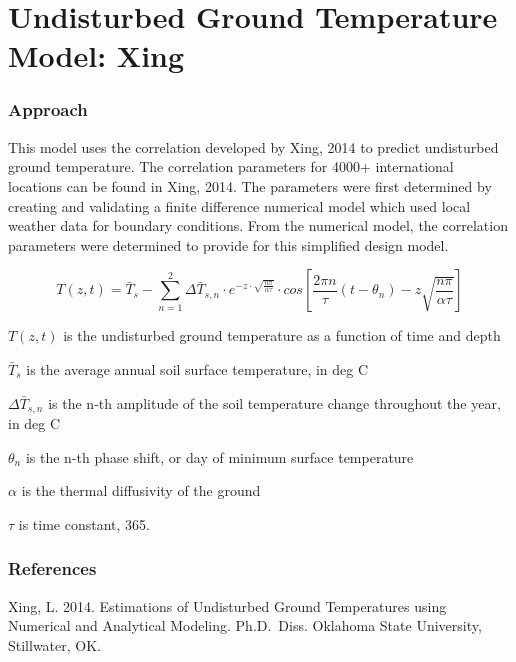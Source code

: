 \section{Undisturbed Ground Temperature Model: Xing}\label{undisturbed-ground-temperature-model-xing}

\subsubsection{Approach}\label{approach-005}

This model uses the correlation developed by Xing, 2014 to predict undisturbed ground temperature. The correlation parameters for 4000+ international locations can be found in Xing, 2014. The parameters were first determined by creating and validating a finite difference numerical model which used local weather data for boundary conditions. From the numerical model, the correlation parameters were determined to provide for this simplified design model.

\begin{equation}
T(z,t) = \bar{T}_{s} - \sum_{n = 1}^{2} \Delta\bar{T}_{s,n} \cdot e^{-z \cdot \sqrt{\frac{n\pi}{\alpha\tau}}} \cdot cos\left[ \frac{2 \pi n}{\tau} \left(t - \theta_{n} \right) - z \sqrt{\frac{n \pi}{\alpha \tau}} \right]
\end{equation}

\(T(z,t)\) is the undisturbed ground temperature as a function of time and depth

\(\bar{T}_{s}\) is the average annual soil surface temperature, in deg C

\(\Delta\bar{T}_{s,n}\) is the n-th amplitude of the soil temperature change throughout the year, in deg C

\(\theta_{n}\) is the n-th phase shift, or day of minimum surface temperature

\(\alpha\) is the thermal diffusivity of the ground

\(\tau\) is time constant, 365.

\subsubsection{References}\label{references-050}

Xing, L. 2014. Estimations of Undisturbed Ground Temperatures using Numerical and Analytical Modeling. Ph.D.~Diss. Oklahoma State University, Stillwater, OK.
